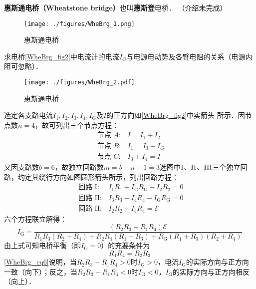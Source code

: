

\textbf{惠斯通电桥（Wheatstone bridge）}也叫\textbf{惠斯登}电桥． （介绍未完成）

\begin{figure}[ht]
\centering
\texttt{[image: ./figures/WheBrg\_1.png]}
\caption{惠斯通电桥} \label{WheBrg_fig1}
\end{figure}

求电桥\autoref{WheBrg_fig2}中电流计的电流$I_G$与电源电动势及各臂电阻的关系（电源内阻可忽略）．
\begin{figure}[ht]
\centering
\texttt{[image: ./figures/WheBrg\_2.pdf]}
\caption{惠斯通电桥} \label{WheBrg_fig2}
\end{figure}

选定各支路电流$I_{1}, I_{2}, I_{3}, I_{4}, I_{\mathrm{G}}$及$I $的正方向如\autoref{WheBrg_fig2}中实箭头
所示．因节点数$n = 4$，故可列出三个节点方程：
\begin{equation}
\begin{array}{ll}\text { 节点 } A: & I=I_{1}+I_{2} \\ \text { 节点 } B: & I_{1}=I_{3}+I_{G} \\ \text { 节点 } C: & I_{3}+I_{4}=I\end{array}
\end{equation}
又因支路数$b=6$，故独立回路数$m=b-n+1=3$选图中$\rm I$、$\rm II$、$\rm III$三个独立回路，约定其绕行方向如图圆形箭头所示，列出回路方程：
\begin{equation}
\begin{array}{ll}\text { 回路 } \mathrm{I}: & I_{1} R_{1}+I_{\mathrm{G}} R_{\mathrm{G}}-I_{2} R_{2}=0 \\ \text { 回路 } \mathrm{II}: & I_{3} R_{3}-I_{4} R_{4}-I_{\mathrm{G}} R_{\mathrm{G}}=0 \\ \text { 回路 } \mathrm{II}  : & I_{2} R_{2}+I_{4} R_{4}=\mathscr{E}\end{array}
\end{equation}
六个方程联立解得：
\begin{equation} \label{WheBrg_eq6}
I_{\mathrm{G}}=\frac{\left(R_{2} R_{3}-R_{1} R_{4}\right) \mathscr{E}}{{R}_{1} R_{3}\left(R_{2}+R_{4}\right)+R_{2} R_{4}\left(R_{1}+R_{3}\right)+R_{\mathrm{G}}\left(R_{1}+R_{3}\right)\left(R_{2}+R_{4}\right)}
\end{equation}
由上式可知电桥平衡（即$I_\mathrm{G} = 0$）的充要条件为
\begin{equation}
R_{1} R_{4}=R_{2} R_{3}
\end{equation}
\autoref{WheBrg_eq6}说明，当$R_{2} R_{3}-R_{1} R_{4}>0$时$I_{\mathrm{G}}>0$，电流$I_{\mathrm{G}}$的实际方向与正方向一致（向下）；反之，当$R_{2} R_{3}-R_{1} R_{4}<0$时$I_{\mathrm{G}}<0$，$I_{\mathrm{G}}$的实际方向与正方向相反（向上）．
